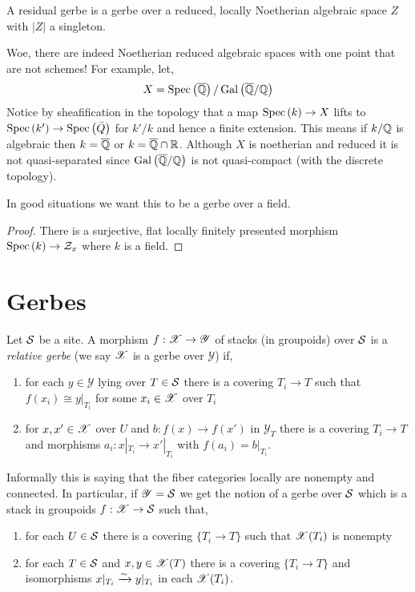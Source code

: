 \documentclass[12pt]{article}
\begin{document}
\begin{prop}
A residual gerbe is a gerbe over a reduced, locally Noetherian algebraic space $Z$ with $|Z|$ a singleton. 
\end{prop}

\newcommand{\Qbar}{\overline{\Q}}

\begin{rmk}
Woe, there are indeed Noetherian reduced algebraic spaces with one point that are not schemes! For example, let,
\[ X = \Spec{\Qbar}/\, \Gal{\Qbar/\Q} \]
Notice by sheafification in the \etale topology that a map $\Spec{k} \to X$ lifts to $\Spec{k'} \to \Spec{\bar{Q}}$ for $k' / k$ \etale and hence a finite extension. This means if $k / \Q$ is algebraic then $k = \Qbar$ or $k = \Qbar \cap \RR$. Although $X$ is noetherian and reduced it is not quasi-separated since $\Gal{\Qbar/\Q}$ is not quasi-compact (with the discrete topology). 
\end{rmk}

\begin{rmk}
In good situations we want this to be a gerbe over a field. 
\end{rmk}

\begin{proof}
There is a surjective, flat locally finitely presented morphism $\Spec{k} \to \cZ_x$ where $k$ is a field. 
\end{proof}

\section{Gerbes}

\newcommand{\fppf}{\mathrm{fppf}}
\newcommand{\Y}{\mathscr{Y}}


\begin{defn}
Let $\S$ be a site. A morphism $f : \X \to \Y$ of stacks (in groupoids) over $\S$ is a \textit{relative gerbe} (we say $\X$ is a gerbe over $\Y$) if,
\begin{enumerate}
\item for each $y \in \Y$ lying over $T \in \S$ there is a covering $T_i \to T$ such that $f(x_i) \cong y|_{T_i}$ for some $x_i \in \X$ over $T_i$
\item for $x,x' \in \X$ over $U$ and $b : f(x) \to f(x')$ in $\Y_T$ there is a covering $T_i \to T$ and morphisms $a_i : x|_{T_i} \to x'|_{T_i}$ with $f(a_i) = b|_{T_i}$. 
\end{enumerate}
\end{defn}

\begin{rmk}
Informally this is saying that the fiber categories locally are nonempty and connected. In particular, if $\Y = \S$ we get the notion of a gerbe over $\S$ which is a stack in groupoids $f : \X \to \S$ such that,
\begin{enumerate}
\item for each $U \in \S$ there is a covering $\{ T_i \to T \}$ such that $\X(T_i)$ is nonempty
\item for each $T \in \S$ and $x,y \in \X(T)$ there is a covering $\{ T_i \to T \}$ and isomorphisms $x|_{T_i} \iso y|_{T_i}$ in each $\X(T_i)$.
\end{enumerate}
\end{rmk}
\end{document}
